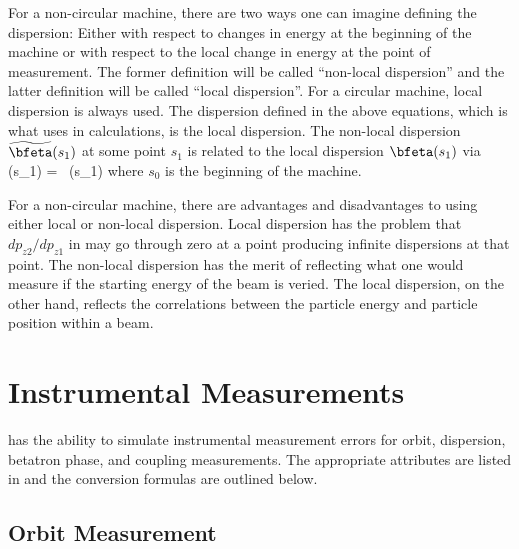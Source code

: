 For a non-circular machine, there are two ways one can imagine
defining the dispersion: Either with respect to changes in energy at
the beginning of the machine or with respect to the local change in
energy at the point of measurement. The former definition will be
called ``non-local dispersion'' and the latter definition will be
called ``local dispersion''. For a circular machine, local dispersion
is always used.  The dispersion defined in the above equations, which
is what \bmad uses in calculations, is the local dispersion. The
non-local dispersion $\wt\bfeta(s_1)$ at some point $s_1$ is related
to the local dispersion $\bfeta(s_1)$ via
\Begineq
  \wt\bfeta(s_1) =  \, \wt\bfeta(s_1)
\Endeq
where $s_0$ is the beginning of the machine.

For a non-circular machine, there are advantages and disadvantages to
using either local or non-local dispersion. Local dispersion has the
problem that $dp_{z2}/dp_{z1}$ in  may go through zero at a
point producing infinite dispersions at that point. The non-local
dispersion has the merit of reflecting what one would measure if the
starting energy of the beam is veried. The local dispersion, on the
other hand, reflects the correlations between the particle energy and
particle position within a beam.

\section{Instrumental Measurements}
\label{s:meas.calc}

\bmad has the ability to simulate instrumental measurement errors
for orbit, dispersion, betatron phase, and coupling measurements.
The appropriate attributes are listed in  and
the conversion formulas are outlined below.

\subsection{Orbit Measurement}

